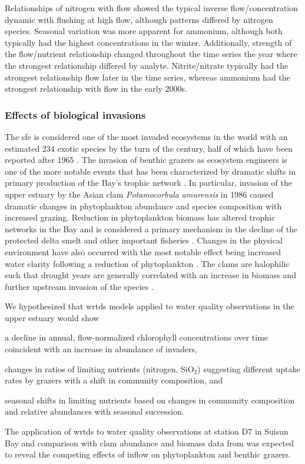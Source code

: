 \documentclass[journal = esthag, manuscript = article]{achemso}\usepackage[]{graphicx}\usepackage[]{color}
\begin{document}
Relationships of nitrogen with flow showed the typical inverse flow/concentration dynamic with flushing at high flow, although patterns differed by nitrogen species.  Seasonal variation was more apparent for ammonium, although both typically had the highest concentrations in the winter.  Additionally, strength of the flow/nutrient relationship changed throughout the time series the year where the strongest relationship differed by analyte.  Nitrite/nitrate typically had the strongest relationship flow later in the time series, whereas ammonium had the strongest relationship with flow in the early 2000s.  

\subsubsection{Effects of biological invasions}

The \acl{sfe} is considered one of the most invaded ecosystems in the world with an estimated 234 exotic species by the turn of the century, half of which have been reported after 1965 \cite{Cohen98}.  The invasion of benthic grazers as ecosystem engineers is one of the more notable events that has been characterized by dramatic shifts in primary production of the Bay's trophic network \cite{Carlton90,Nichols90,Werner93,Crauder16}.  In particular, invasion of the upper estuary by the Asian clam \textit{Potamocorbula amurensis} in 1986 caused dramatic changes in phytoplankton abundance and species composition with increased grazing.  Reduction in phytoplankton biomass has altered trophic networks in the Bay and is considered a primary mechanism in the decline of the protected delta smelt and other important fisheries \cite{Feyrer03,MacNally10}.  Changes in the physical environment have also occurred with the most notable effect being increased water clarity following a reduction of phytoplankton \cite{MacNally10}. The clams are halophilic such that drought years are generally correlated with an increase in biomass and further upstream invasion of the species \cite{Parchaso02,Cloern12b}.

We hypothesized that \ac{wrtds} models applied to water quality observations in the upper estuary would show \begin{inparaenum}[1\upshape)]
\item a decline in annual, flow-normalized chlorophyll concentrations over time coincident with an increase in abundance of invaders, 
\item changes in ratios of limiting nutrients (nitrogen, SiO$_2$) suggesting different uptake rates by grazers with a shift in community composition, and 
\item seasonal shifts in limiting nutrients based on changes in community composition and relative abundances with seasonal succession. 
\end{inparaenum}
The application of \ac{wrtds} to water quality observations at station D7 in Suisun Bay and comparison with clam abundance and biomass data from \cite{Crauder16} was expected to reveal the competing effects of inflow on phytoplankton and benthic grazers.
\end{document}
